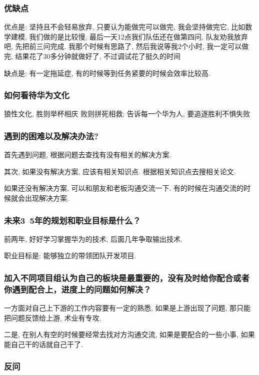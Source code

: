 \documentclass[UTF8]{ctexart}
\begin{document}
\subsubsection{优缺点}
优点是: 坚持且不会轻易放弃, 只要认为能做完可以做完, 我会坚持做完它, 比如数学建模, 我们做的是比较慢, 最后一天12点我们队伍还在做第四问, 队友劝我放弃吧, 先把前三问完成. 我那个时候有思路了, 然后我说等我2个小时, 我一定可以做完, 结果花了30多分钟就做好了, 不过调试花了挺久的时间

缺点是: 有一定拖延症, 有的时候等到任务紧要的时候会效率比较高.

\subsubsection{如何看待华为文化}
狼性文化, 胜则举杯相庆 败则拼死相救; 告诉每一个华为人, 要追逐胜利不惧失败

\subsubsection{遇到的困难以及解决办法?}
首先遇到问题, 根据问题去查找有没有相关的解决方案.

其次, 如果没有解决方案, 应该有相关知识点. 根据相关知识点去搜相关论文.

如果还没有解决方案, 可以和朋友和老板沟通交流一下. 有的时候在沟通交流的时候就会出现解决方案.

\subsubsection{未来3~5年的规划和职业目标是什么？}

前两年, 好好学习掌握华为的技术, 后面几年争取输出技术.

职业目标是: 能够独立的带领团队开发项目.

\subsubsection{加入不同项目组认为自己的板块是最重要的，没有及时给你配合或者你遇到配合上，进度上的问题如何解决？}

一方面对自己上下游的工作内容要有一定的熟悉, 如果是上游出现了问题, 那只能把问题反馈给上游, 术业有专攻.

二是, 在别人有空的时候要经常去找对方沟通交流, 如果是要配合的一些小事, 如果能自己干的话就自己干了.

\subsubsection{反问}
\end{document}
